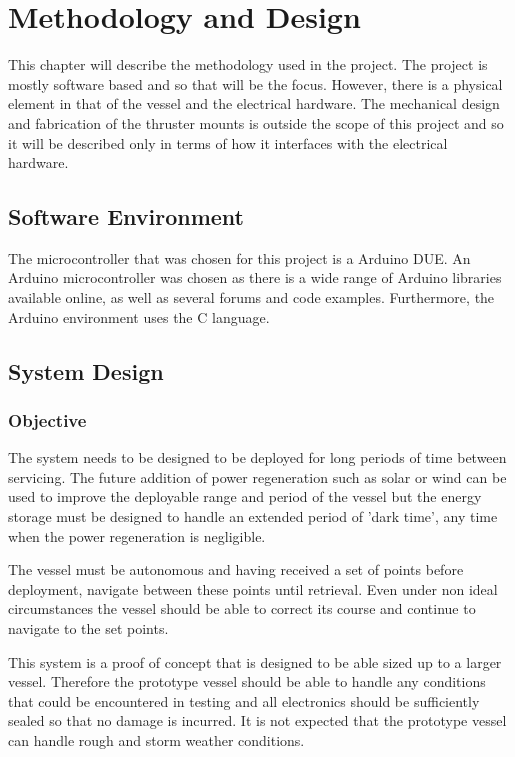 \chapter{Methodology and Design}
This chapter will describe the methodology used in the project. The project is mostly software based and so that will be the focus. However, there is a physical element in that of the vessel and the electrical hardware. The mechanical design and fabrication of the thruster mounts is outside the scope of this project and so it will be described only in terms of how it interfaces with the electrical hardware.\par
\section{Software Environment}
The microcontroller that was chosen for this project is a Arduino DUE. An Arduino microcontroller was chosen as there is a wide range of Arduino libraries available online, as well as several forums and code examples. Furthermore, the Arduino environment uses the C language. \par
\section{System Design}
	\subsection{Objective}
	The system needs to be designed to be deployed for long periods of time between servicing. The future addition of power regeneration such as solar or wind can be used to improve the deployable range and period of the vessel but the energy storage must be designed to handle an extended period of 'dark time', any time when the power regeneration is negligible. \par
	The vessel must be autonomous and having received a set of points before deployment, navigate between these points until retrieval. Even under non ideal circumstances the vessel should be able to correct its course and continue to navigate to the set points. \par
	This system is a proof of concept that is designed to be able sized up to a larger vessel. Therefore the prototype vessel should be able to handle any conditions that could be encountered in testing and all electronics should be sufficiently sealed so that no damage is incurred. It is not expected that the prototype vessel can handle rough and storm weather conditions.\par
